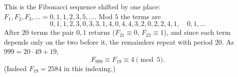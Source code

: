 This is the Fibonacci sequence shifted by one place: $F_1,F_2,F_3,\ldots=0,1,1,2,3,5,\ldots$. Mod $5$ the terms are
\[0,1,1,2,3,0,3,3,1,4,0,4,4,3,2,0,2,2,4,1,\quad0,1,\ldots\]
After $20$ terms the pair $0,1$ returns ($F_{21}\equiv0$, $F_{22}\equiv1$), and since each term depends only on the two before it, the remainders repeat with period $20$. As $999=20\cdot49+19$,
\[F_{999}\equiv F_{19}\equiv\boxed{4}\pmod5 .\]
(Indeed $F_{19}=2584$ in this indexing.)
